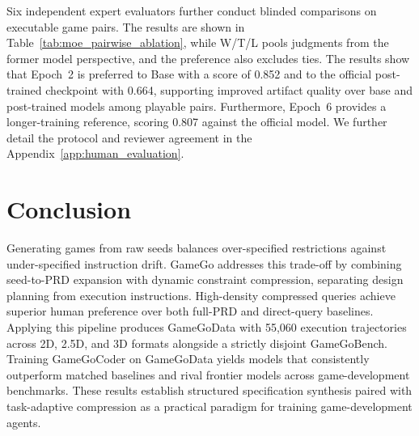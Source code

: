 \documentclass{article}
\begin{document}
\begin{table}
      \vspace{-20pt}
      \centering
      \scriptsize
      \setlength{\tabcolsep}{3pt}
      \caption{Blinded human preference for GameGo-trained MoE checkpoints. $N$ includes pairs with playable artifacts.}
      \label{tab:moe_pairwise_ablation}
      \vspace{-8pt}
  \end{table}

Six independent expert evaluators further conduct blinded comparisons on executable game pairs.  The results are shown in Table~\ref{tab:moe_pairwise_ablation}, while W/T/L pools judgments from the former model perspective, and the preference also excludes ties. The results show that Epoch~2 is preferred to Base with a score of 0.852 and to the official post-trained checkpoint with 0.664, supporting improved artifact quality over base and post-trained models among playable pairs. Furthermore, Epoch~6 provides a longer-training reference, scoring 0.807 against the official model. We further detail the protocol and reviewer agreement in the Appendix~\ref{app:human_evaluation}.

\vspace{-8pt}
\section{Conclusion}
\vspace{-8pt}
 
Generating games from raw seeds balances over-specified restrictions against under-specified instruction drift. GameGo addresses this trade-off by combining seed-to-PRD expansion with dynamic constraint compression, separating design planning from execution instructions. High-density compressed queries achieve superior human preference over both full-PRD and direct-query baselines. Applying this pipeline produces GameGoData with 55,060 execution trajectories across 2D, 2.5D, and 3D formats alongside a strictly disjoint GameGoBench. Training GameGoCoder on GameGoData yields models that consistently outperform matched baselines and rival frontier models across game-development benchmarks. These results establish structured specification synthesis paired with task-adaptive compression as a practical paradigm for training game-development agents.
\end{document}
